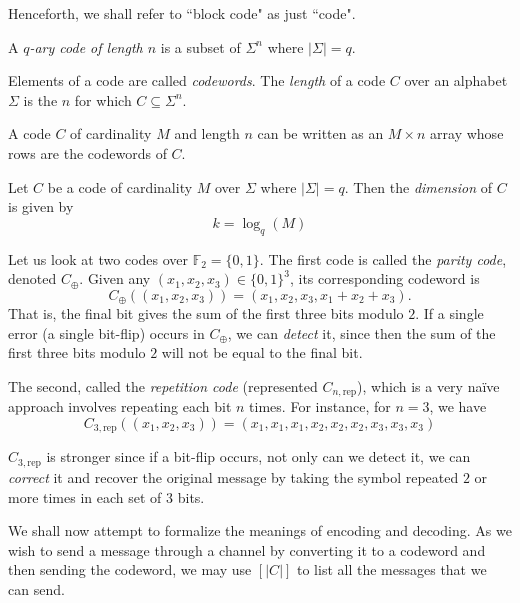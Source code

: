 Henceforth, we shall refer to ``block code" as just ``code".

A \textit{$q$-ary code of length $n$} is a subset of $\Sigma^n$ where $|\Sigma|=q$.

\begin{definition}
    Elements of a code are called \textit{codewords}. The \textit{length} of a code $C$ over an alphabet $\Sigma$ is the $n$ for which $C\subseteq\Sigma^n$.
\end{definition}

A code $C$ of cardinality $M$ and length $n$ can be written as an $M\times n$ array whose rows are the codewords of $C$.

\begin{definition}
\label{dimCodeDef}
    Let $C$ be a code of cardinality $M$ over $\Sigma$ where $|\Sigma|=q$. Then the \textit{dimension} of $C$ is given by
    $$k=\log_q(M)$$
\end{definition}

\begin{example}
\label{parityCodeAndRepCodeExample}
    Let us look at two codes over $\mathbb{F}_2=\{0,1\}$. The first code is called the \textit{parity code}, denoted $C_\oplus$. Given any $(x_1,x_2,x_3)\in \{0,1\}^3$, its corresponding codeword is
    $$C_\oplus((x_1,x_2,x_3))=(x_1,x_2,x_3,x_1+x_2+x_3).$$
    That is, the final bit gives the sum of the first three bits modulo $2$. If a single error (a single bit-flip) occurs in $C_\oplus$, we can \textit{detect} it, since then the sum of the first three bits modulo $2$ will not be equal to the final bit.
    
    The second, called the \textit{repetition code} (represented $C_{n,\text{rep}}$), which is a very na\"ive approach involves repeating each bit $n$ times. For instance, for $n=3$, we have
    $$C_{3,\text{rep}}((x_1,x_2,x_3))=(x_1,x_1,x_1,x_2,x_2,x_2,x_3,x_3,x_3)$$
\end{example}


$C_{3,\text{rep}}$ is stronger since if a bit-flip occurs, not only can we detect it, we can \textit{correct} it and recover the original message by taking the symbol repeated $2$ or more times in each set of $3$ bits.

\vspace{2mm}
We shall now attempt to formalize the meanings of encoding and decoding. As we wish to send a message through a channel by converting it to a codeword and then sending the codeword, we may use $[|C|]$ to list all the messages that we can send.

